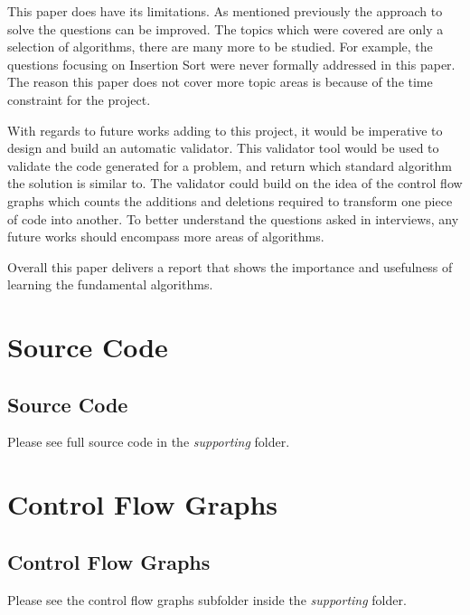\documentclass[10pt,twocolumn,hidelinks]{IEEEtran}
\begin{document}
 \par This paper does have its limitations. As mentioned previously the approach to solve the questions can be improved. The topics which were covered are only a selection of algorithms, there are many more to be studied. For example, the questions focusing on Insertion Sort were never formally addressed in this paper. The reason this paper does not cover more topic areas is because of the time constraint for the project.
 \par With regards to future works adding to this project, it would be imperative to design and build an automatic validator. This validator tool would be used to validate the code generated for a problem, and return which standard algorithm the solution is similar to. The validator could build on the idea of the control flow graphs which counts the additions and deletions required to transform one piece of code into another. 
 To better understand the questions asked in interviews, any future works should encompass more areas of algorithms. 
 \par Overall this paper delivers a report that shows the importance and usefulness of learning the fundamental algorithms.
 





\clearpage
 \appendix
\section{Source Code}
\subsection{Source Code}
\label{whatever}
\par Please see full source code in the \textit{supporting} folder.  
\section{Control Flow Graphs}
\subsection{Control Flow Graphs}
\par Please see the control flow graphs subfolder inside the \textit{supporting} folder. 
\label{whatever}
 
\end{document}
